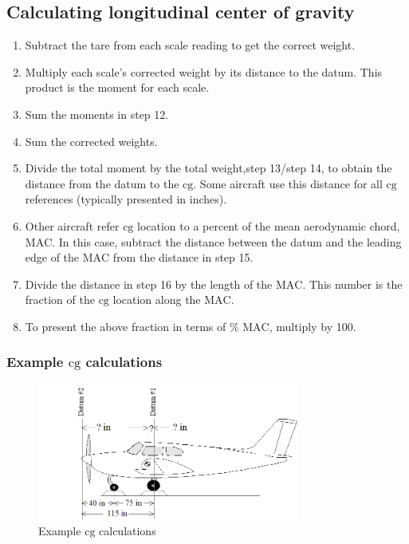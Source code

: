 \documentclass[
]{book}
\providecommand{\tightlist}{%
  \setlength{\itemsep}{0pt}\setlength{\parskip}{0pt}}
\begin{document}
\hypertarget{calculating-longitudinal-center-of-gravity}{%
\subsection*{Calculating longitudinal center of gravity}\label{calculating-longitudinal-center-of-gravity}}

\begin{enumerate}
\def\labelenumi{\arabic{enumi}.}
\setcounter{enumi}{10}
\tightlist
\item
  Subtract the tare from each scale reading to get the correct weight.
\item
  Multiply each scale's corrected weight by its distance to the datum. This product is the moment for each scale.
\item
  Sum the moments in step 12.
\item
  Sum the corrected weights.
\item
  Divide the total moment by the total weight,step 13/step 14, to obtain the distance from the datum to the \(\mathrm{cg}\). Some aircraft use this distance for all \(\mathrm{cg}\) references (typically presented in inches).
\item
  Other aircraft refer \(\mathrm{cg}\) location to a percent of the mean aerodynamic chord, \(\mathrm{MAC}\). In this case, subtract the distance between the datum and the leading edge of the \(\mathrm{MAC}\) from the distance in step 15.
\item
  Divide the distance in step 16 by the length of the \(\mathrm{MAC}\). This number is the fraction of the \(\mathrm{cg}\) location along the \(\mathrm{MAC}\).
\item
  To present the above fraction in terms of \% \(\mathrm{MAC}\), multiply by 100.
\end{enumerate}

\hypertarget{example-mathrmcg-calculations}{%
\subsubsection*{\texorpdfstring{Example \(\mathrm{cg}\) calculations}{Example \textbackslash mathrm\{cg\} calculations}}\label{example-mathrmcg-calculations}}

\begin{figure}
\centering
\includegraphics[width=3.38889in,height=1.77083in]{media/07/image1.png}
\caption{Example \(\mathrm{cg}\) calculations}
\end{figure}
\end{document}
